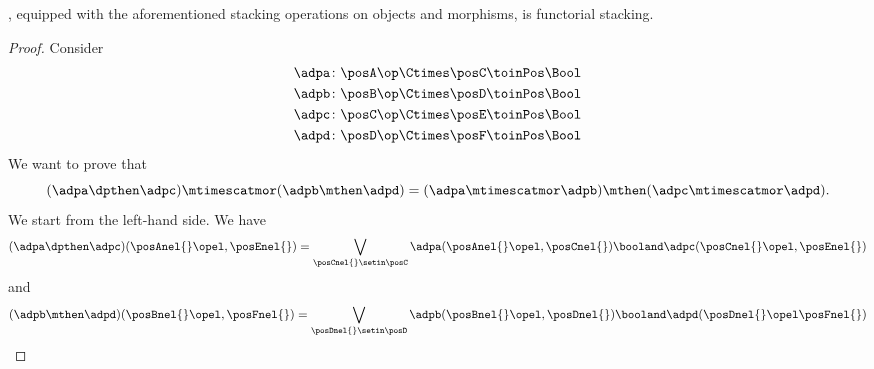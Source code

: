 \begin{lemma}\label{lem:DPL-functorial-stacking}
    \DPL, equipped with the aforementioned stacking operations on objects and morphisms, is functorial stacking.
\end{lemma}

\begin{proof}
    Consider
    \begin{equation}
        \begin{aligned}
            \adpa\colon \posA\op\Ctimes \posC & \toinPos \Bool \\
            \adpb\colon \posB\op\Ctimes \posD & \toinPos \Bool \\
            \adpc\colon \posC\op\Ctimes \posE & \toinPos \Bool \\
            \adpd\colon \posD\op\Ctimes \posF & \toinPos \Bool
        \end{aligned}
    \end{equation}
    We want to prove that
    \begin{equation}
        (\adpa \dpthen \adpc)
        \mtimescatmor (\adpb \mthen \adpd)=(\adpa \mtimescatmor \adpb) \mthen (\adpc \mtimescatmor \adpd).
    \end{equation}
    We start from the left-hand side.
    We have
    \begin{equation}
        (\adpa \dpthen \adpc)(\posAnel{}\opel,\posEnel{})
        =\bigvee_{\posCnel{}\setin \posC}
        \adpa(\posAnel{}\opel, \posCnel{}) \booland \adpc(\posCnel{}\opel,\posEnel{})
    \end{equation}
    and
    \begin{equation}
        \begin{aligned}
            (\adpb \mthen \adpd)(\posBnel{}\opel,\posFnel{})
            =\bigvee_{\posDnel{}\setin \posD}
            \adpb(\posBnel{}\opel, \posDnel{}) \booland \adpd(\posDnel{}\opel\posFnel{})

\end{aligned}
\end{equation}
\end{proof}
